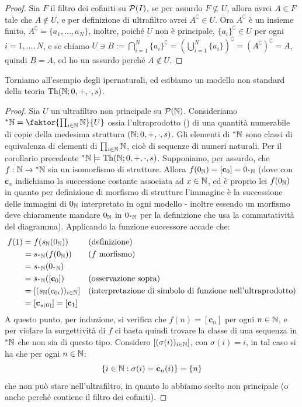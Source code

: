\begin{proof}
    Sia $F$ il filtro dei cofiniti su $\mathcal{P}(I)$, se per assurdo $F \not\subseteq U$, allora avrei $A \in F$ tale che $A \notin U$, e per definizione di ultrafiltro avrei $A^\complement \in U$.
    Ora $A^\complement$ è un insieme finito, $A^\complement = \{a_1,\ldots,a_N\}$, inoltre, poiché $U$ non è principale, $\{a_i\}^\complement \in U$ per ogni $i = 1,\ldots,N$, e se chiamo $U \ni B := \bigcap_{i=1}^N \{a_i\}^\complement = \left(\bigcup_{i=1}^N \{a_i\}\right)^\complement = (A^\complement)^\complement = A$,
    quindi $B = A$, ed ho un assurdo perché $A \notin U$.
\end{proof}

Torniamo all'esempio degli ipernaturali, ed esibiamo un modello non standard della teoria $\operatorname{Th}(\mathbb N;0,+,\cdot,s)$.

\begin{proof}
    Sia $U$ un ultrafiltro non principale su $\mathcal{P}(\mathbb N)$. Consideriamo ${}^*\NN = \faktor{\prod_{i \in \NN}\NN}{U}$ ossia l'ultraprodotto () di una quantità numerabile di copie della medesima struttura $(\mathbb N;0,+,\cdot,s)$.
    Gli elementi di ${}^*\mathbb N$ sono classi di equivalenza di elementi di $\prod_{i \in \mathbb N}\mathbb N$, cioè di sequenze di numeri naturali. Per il corollario precedente ${}^*\mathbb N \models \operatorname{Th}(\mathbb N;0,+,\cdot,s)$. Supponiamo, per assurdo, che $f : \mathbb N \to {}^*\mathbb N$ sia un isomorfismo di strutture.
    Allora $f(0_\mathbb N) = [\mathbf{c}_0] = 0_{{}^*\mathbb N}$ (dove con $\mathbf{c}_x$ indichiamo la successione costante associata ad $x \in \mathbb N$, ed è proprio lei $f(0_\mathbb N)$ in quanto per definizione di morfismo di strutture l'immagine è la successione 
    delle immagini di $0_\mathbb N$ interpretato in ogni modello - inoltre essendo un morfismo deve chiaramente mandare $0_\mathbb N$ in $0_{{}^*\mathbb N}$ per la definizione che usa la commutatività del diagramma).
    Applicando la funzione successore accade che:
    \begin{align*}
        f(1) &= f(s_\mathbb N(0_\mathbb N)) &&\text{(definizione)}\\
             &= s_{{}^*\mathbb N}(f(0_\mathbb N)) &&\text{($f$ morfismo)}\\
             &= s_{{}^*\mathbb N}(0_{{}^*\mathbb N})\\
             &= s_{{}^*\mathbb N}([\mathbf{c}_0]) &&\text{(osservazione sopra)}\\
             &= [(s_\mathbb N(c_{0i}))_{i \in \mathbb N}] &&\text{(interpretazione di simbolo di funzione nell'ultraprodotto)}\\
             &= [\mathbf{c}_{s(0)}] = [\mathbf{c}_1] 
    \end{align*}
    A questo punto, per induzione, si verifica che $f(n) = [\mathbf{c}_n]$ per ogni $n \in \mathbb N$, e per violare la surgettività di $f$ ci basta quindi trovare la classe di una sequenza in ${}^*\mathbb N$ che non sia di questo tipo.
    Considero $[(\sigma(i))_{i \in \mathbb N}]$, con $\sigma(i) = i$, in tal caso si ha che per ogni $n \in \mathbb N$:
    \[ \{ i \in \mathbb N : \sigma(i) = \mathbf{c}_n(i) \} = \{n\}\]
    che non può stare nell'ultrafiltro, in quanto lo abbiamo scelto non principale (o anche perché contiene il filtro dei cofiniti).
\end{proof}

